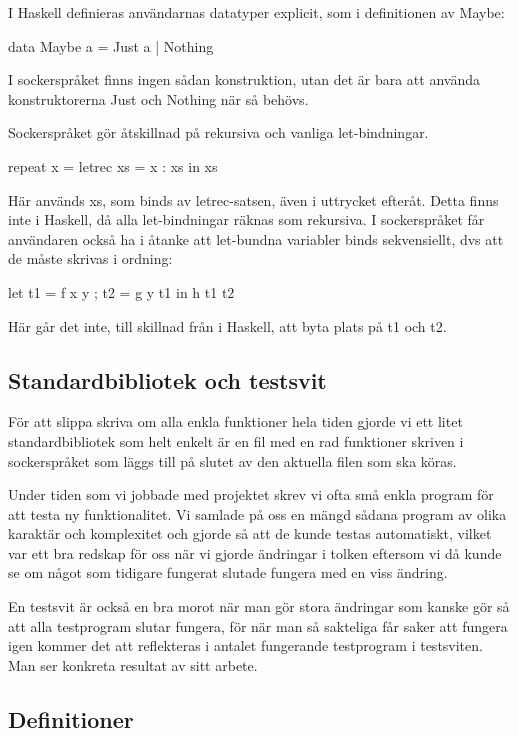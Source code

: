 \documentclass[Rapport]{subfiles}
\begin{document}
    I Haskell definieras användarnas datatyper explicit, som i definitionen
av Maybe:
\begin{codeEx}
data Maybe a = Just a | Nothing
\end{codeEx}
I sockerspråket finns ingen sådan konstruktion, utan det är bara att använda
konstruktorerna Just och Nothing när så behövs.


Sockerspråket gör åtskillnad på rekursiva och vanliga let-bindningar. 
\begin{codeEx}
repeat x = letrec xs = x : xs in xs  
\end{codeEx}
Här används xs, som binds av letrec-satsen, även i uttrycket efteråt. Detta
finns inte i Haskell, då alla let-bindningar räknas som rekursiva. I
sockerspråket får användaren också ha i åtanke att let-bundna variabler binds
sekvensiellt, dvs att de måste skrivas i ordning:
\begin{codeEx}
let { t1 = f x y
    ; t2 = g y t1
    }
in  h t1 t2
\end{codeEx}
Här går det inte, till skillnad från i Haskell, att byta plats på t1 och t2.

\subsection{Standardbibliotek och testsvit}

För att slippa skriva om alla enkla funktioner hela tiden gjorde vi ett litet standardbibliotek
som helt enkelt är en fil med en rad funktioner skriven i sockerspråket som läggs
till på slutet av den aktuella filen som ska köras.

Under tiden som vi jobbade med projektet skrev vi ofta små enkla
program för att testa ny funktionalitet. Vi samlade på oss en mängd sådana program av
olika karaktär och komplexitet och gjorde så att de kunde testas automatiskt, 
vilket var ett bra redskap för oss 
när vi gjorde ändringar i tolken eftersom vi då kunde se om något som tidigare
fungerat slutade fungera med en viss ändring. 

En testsvit är också en bra morot när man gör stora ändringar som kanske gör så att
alla testprogram slutar fungera, för när man så sakteliga får saker att fungera
igen kommer det att reflekteras i antalet fungerande testprogram i testsviten. 
Man ser konkreta resultat av sitt arbete.



\subsection{Definitioner}
\end{document}
